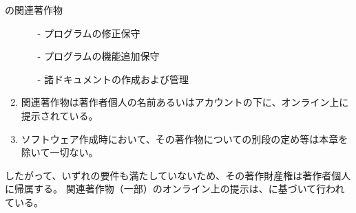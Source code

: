 \begin{Column}{\DMname の関連著作物}
\begin{enumerate}[label=\Roman*]
\begin{enumerate}
  \item[-] プログラムの修正保守
  \item[-] プログラムの機能追加保守
  \item[-] 諸ドキュメントの作成および管理
  \end{enumerate}
\item 関連著作物は著作者個人の名前あるいはアカウントの下に、オンライン上に提示されている。
\item ソフトウェア作成時において、その著作物についての別段の定め等は本章を除いて一切ない。
\end{enumerate}
したがって、いずれの要件も満たしていないため、その著作財産権は著作者個人に帰属する。
関連著作物（一部）のオンライン上の提示は、に基づいて行われている。
\end{Column}

